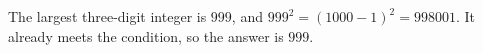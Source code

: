 The largest three-digit integer is $999$, and $999^2=(1000-1)^2=998001$. It already meets the condition, so the answer is $\boxed{999}$.
